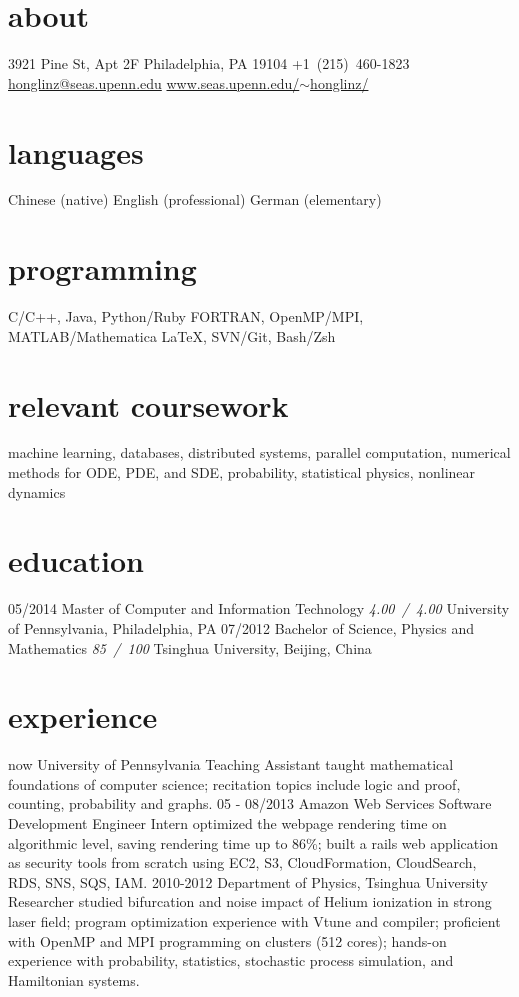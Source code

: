 \documentclass[print]{friggeri-cv}
\begin{document}
{}

\begin{aside}
  \section{about}
  3921 Pine St, Apt 2F
  Philadelphia, PA
  19104
  +1~(215)~460-1823
  \href{mailto:honglinz@seas.upenn.edu}{honglinz@seas.upenn.edu}
  \href{http://www.seas.upenn.edu/~honglinz/}{www.seas.upenn.edu/$\sim$honglinz/}
  \section{languages}
  Chinese (native)
  English (professional)
  German (elementary)
  \section{programming}
  C/C++, Java, Python/Ruby
  FORTRAN, OpenMP/MPI, MATLAB/Mathematica
  \LaTeX, SVN/Git, Bash/Zsh
\end{aside}

\section{relevant coursework}
machine learning, databases, distributed systems, parallel computation, numerical methods for ODE, PDE, and SDE, probability, statistical physics, nonlinear dynamics
\section{education}

\begin{entrylist}
  \entry
    {05/2014}
    {Master of Computer and Information Technology}
    {\emph{4.00~/~4.00}}
    {University of Pennsylvania, Philadelphia, PA}
  \entry
    {07/2012}
    {Bachelor of Science, Physics and Mathematics}
    {\emph{85~/~100}}
    {Tsinghua University, Beijing, China}
\end{entrylist}
\section{experience}
\begin{entrylist}
  \entry
  {now}
  {University of Pennsylvania}
  {Teaching Assistant}
  {taught mathematical foundations of computer science; recitation topics include logic and proof, counting, probability and graphs.}
  \entry
  {05 - 08/2013}
  {Amazon Web Services}
  {Software Development Engineer Intern}
  {optimized the webpage rendering time on algorithmic level, saving rendering time up to 86\%; built a rails web application as security tools from scratch using EC2, S3, CloudFormation, CloudSearch, RDS, SNS, SQS, IAM.}
  \entry
  {2010-2012}
  {Department of Physics, Tsinghua University}
  {Researcher}
  {studied bifurcation and noise impact of Helium ionization in strong laser field; program optimization experience with Vtune and compiler; proficient with OpenMP and MPI programming on clusters (512 cores); hands-on experience with probability, statistics, stochastic process simulation, and Hamiltonian systems.}
\end{entrylist}
\end{document}
